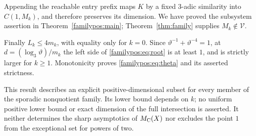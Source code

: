 Appending the reachable entry prefix maps $K$ by a fixed
$3$-adic similarity into $C(1,M_k)$, and therefore preserves
its dimension. We have proved the subsystem assertion in
Theorem~\ref{familypos:main}; Theorem~\ref{thm:family} supplies
$M_k\notin\mathcal V$.

Finally $L_k\le4m_k$, with equality only for $k=0$.
Since $\vartheta^{-1}+\vartheta^{-4}=1$, at
$d=(\log_3\vartheta)/m_k$ the left side of
\eqref{familypos:eq:root} is at least $1$, and is strictly
larger for $k\ge1$. Monotonicity proves
\eqref{familypos:eq:theta} and its asserted strictness.

\begin{remark}[Scope]
This result describes an explicit positive-dimensional subset for
every member of the sporadic nonquotient family. Its lower bound
depends on $k$; no uniform positive lower bound or exact dimension
of the full intersection is asserted. It neither determines the
sharp asymptotics of $M_{\mathrm C}(X)$ nor excludes the point $1$ from
the exceptional set for powers of two.
\end{remark}
